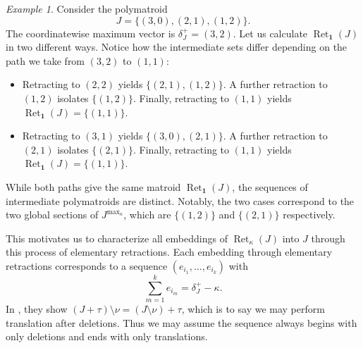 \documentclass[11pt]{article}
\theoremstyle{definition}
\theoremstyle{remark}
\newtheorem{example}[theorem]{Example}
\newcommand{\delplus}{\delta_J^+}
\newcommand{\ones}{\textbf{1}}
\DeclareMathOperator{\Ret}{Ret}                %
\newcommand{\RetK}{\Ret_{\kappa}}              %
\newcommand{\Jmax}{J^{\max_{\kappa}}}
\begin{document}
\begin{example}
Consider the polymatroid 
\[
J = \{(3,0), (2,1), (1,2)\}.
\] 
The coordinatewise maximum vector is $\delplus = (3,2)$. Let us calculate $\Ret_{\ones}(J)$ in two different ways. Notice how the intermediate sets differ depending on the path we take from $(3,2)$ to $(1,1)$:

\begin{itemize}
    \item 
    Retracting to $(2,2)$ yields $\{(2,1), (1,2)\}$. A further retraction to $(1,2)$ isolates $\{(1,2)\}$. Finally, retracting to $(1,1)$ yields $\Ret_{\ones}(J) = \{(1,1)\}$.
    
    \item 
    Retracting to $(3,1)$ yields $\{(3,0), (2,1)\}$. A further retraction to $(2,1)$ isolates $\{(2,1)\}$. Finally, retracting to $(1,1)$ yields $\Ret_{\ones}(J) = \{(1,1)\}$.
\end{itemize}

While both paths give the same matroid $\Ret_{\ones}(J)$, the sequences of intermediate polymatroids are distinct. Notably, the two cases correspond to the two global sections of $\Jmax$, which are $\{(1,2)\}$ and $\{(2,1)\}$ respectively.
\end{example}
This motivates us to characterize all embeddings of $\RetK(J)$ into $J$ through this process of elementary retractions. Each embedding through elementary retractions corresponds to a sequence $(e_{i_1},\dots,e_{i_k})$ with \[
\sum_{m=1}^k e_{i_m} = \delplus - \kappa.
\]
In \cite{baker2025representationtheorypolymatroids}, they show $(J + \tau) \setminus \nu = (J \setminus \nu) + \tau$, which is to say we may perform translation after deletions. Thus we may assume the sequence always begins with only deletions and ends with only translations.
\end{document}
